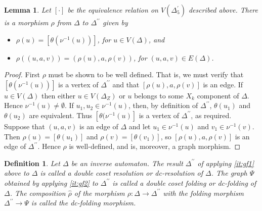 \documentclass[a4paper,12pt]{article}
\newcommand{\D}{\Delta }
\renewcommand{\S}{\Sigma }
\newcommand{\nul}{\emptyset }
\newtheorem{lemma}[theorem]{Lemma}
\newtheorem{definition}[theorem]{Definition}
\numberwithin{equation}{section}
\numberwithin{figure}{section}
\newcommand{\maps}{\rightarrow}
\begin{document}
\begin{lemma}\label{lem:resol-quot}
Let $[\cdot]$ be the equivalence relation on $V(\D^\prime_5)$
described above. There is a morphism $\rho$ from  $\D$ to
$\D^{\prime\prime}$ given by 
\begin{itemize}
\item 
$\rho(u)=[\theta(\nu^{-1}(u))]$, for
$u\in V(\D)$, and 
\item 
$\rho((u,a,v))=(\rho(u),a,\rho(v))$, for $(u,a,v)\in  E(\D)$. 
\end{itemize}
\end{lemma}
\begin{proof}
First $\rho$ must be shown to be well defined. 
That is, we must verify that $[\theta(\nu^{-1}(u))]$ is a vertex of
$\D^{\prime\prime}$ and that $[\rho(u),a,\rho(v)]$ is an edge. 
If $u \in V(\D)$  
then either $u\in V(\D_Z)$ or  $u$ belongs to
some $X_k$ component of $\D$. Hence
 $\nu^{-1}(u)\neq \nul$. If $u_1, u_2\in \nu^{-1}(u)$, then, 
by definition of
$\D^{\prime\prime}$, $\theta(u_1)$ and $\theta(u_2)$ are equivalent.
Thus $[\theta(\nu^{-1}(u)]$ is a vertex of $\D^{\prime\prime}$,
as required. 
 Suppose that $(u,a,v)$ is an edge
of $\D$ and let $u_1\in \nu^{-1}(u)$ and $v_1\in \nu^{-1}(v)$. Then
$\rho(u)=[\theta(u_1)]$ and $\rho(v)=[\theta(v_1)]$, so 
$[\rho(u), a, \rho(v)]$ is an edge of $\D^{\prime\prime}$. 
Hence $\rho$ is well-defined, and is, moreover, a graph morphism.
\end{proof}


\begin{definition}
Let $\D$ be an inverse automaton.
 The result $\D^{\prime\prime}$ of applying  \ref{it:gf1}
above to $\D$ is called a \emph{double coset resolution} or
\emph{dc-resolution} of $\D$. The graph $\Psi$ obtained by applying
 \ref{it:gf2} to $\D^{\prime\prime}$ is called a \emph{double
coset folding} or \emph{dc-folding} of $\D$.  The composition $\hat\rho$ of
the  morphism
$\rho:\D\maps \D^{\prime\prime}$ with the folding morphism $\D^{\prime\prime}\maps
\Psi$ is called the \emph{dc-folding morphism}.
\end{definition}
\end{document}
